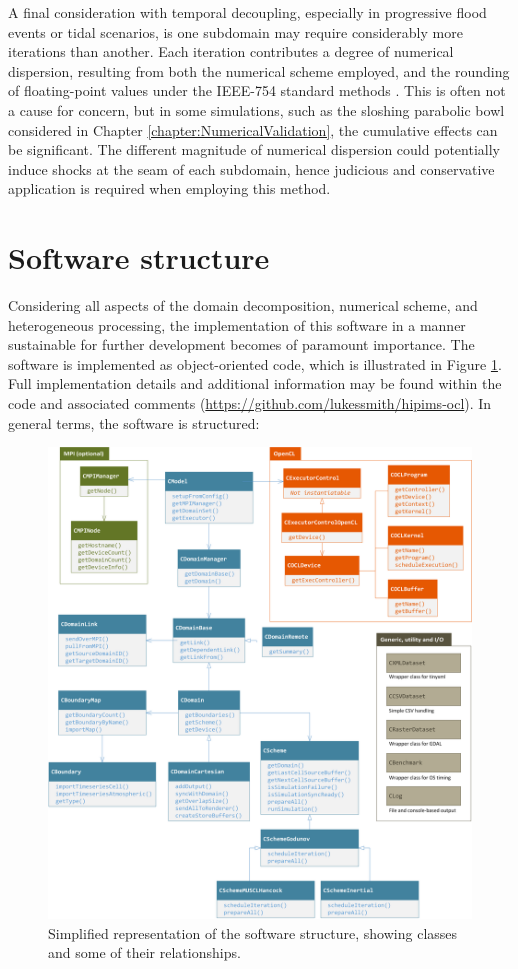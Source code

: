 A final consideration with temporal decoupling, especially in progressive flood events or tidal scenarios, is one subdomain may require considerably more iterations than another. Each iteration contributes a degree of numerical dispersion, resulting from both the numerical scheme employed, and the rounding of floating-point values under the IEEE-754 standard methods \citep{InternationalOrganizationforStandardization2011}. This is often not a cause for concern, but in some simulations, such as the sloshing parabolic bowl considered in Chapter \ref{chapter:NumericalValidation}, the cumulative effects can be significant. The different magnitude of numerical dispersion could potentially induce shocks at the seam of each subdomain, hence judicious and conservative application is required when employing this method.

\section{Software structure}

Considering all aspects of the domain decomposition, numerical scheme, and heterogeneous processing, the implementation of this software in a manner sustainable for further development becomes of paramount importance. The software is implemented as object-oriented code, which is illustrated in Figure \ref{Software_Class_Final}. Full implementation details and additional information may be found within the code and associated comments  (\url{https://github.com/lukessmith/hipims-ocl}). In general terms, the software is structured:

\begin{figure}[p]
	\centering
	\includegraphics[width=1.0\textwidth]{mpi-figures/class-diagram.png}
	\caption{Simplified representation of the software structure, showing classes and some of their relationships.}
	\label{Software_Class_Final}
\end{figure}

